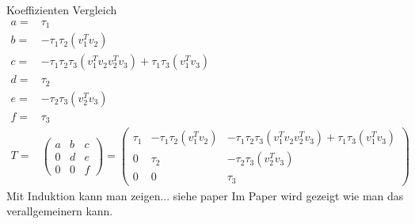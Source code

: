 Koeffizienten Vergleich
\begin{align*}
	a =&  \tau_1\\
	b =& -\tau_1 \tau_2 (v_1^T v_2 ) \\
	c =& -\tau_1 \tau_2  \tau_3 (v_1^T v_2 v_2^T v_3) + \tau_1 \tau_3  (v_1^T v_3)\\
	d =&  \tau_2 \\
	e =& -\tau_2 \tau_3  (v_2^T v_3)\\
    f =&  \tau_3\\
	T =&
	\begin{pmatrix}
	a & b & c\\ 
	0 & d & e\\
	0 & 0 & f
	\end{pmatrix} =
	\begin{pmatrix}
		\tau_1 & -\tau_1 \tau_2 (v_1^T v_2 ) & - \tau_1 \tau_2  \tau_3 (v_1^T v_2 v_2^T v_3) + \tau_1 \tau_3  (v_1^T v_3)\\ 
		0 & \tau_2 &  -\tau_2 \tau_3  (v_2^T v_3)\\
		0 & 0 & \tau_3
	\end{pmatrix}
\end{align*}
Mit Induktion kann man zeigen... siehe paper
Im Paper wird gezeigt wie man das verallgemeinern kann. \cite{Joffrain:2006:AHT:1141885.1141886}
%

